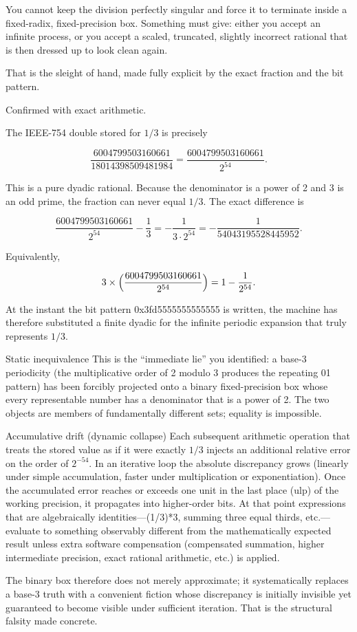 You cannot keep the division perfectly singular and force it to terminate inside a fixed-radix, fixed-precision box. Something must give: either you accept an infinite process, or you accept a scaled, truncated, slightly incorrect rational that is then dressed up to look clean again.

That is the sleight of hand, made fully explicit by the exact fraction and the bit pattern.

Confirmed with exact arithmetic.

The IEEE-754 double stored for \(1/3\) is precisely

\[
\frac{6004799503160661}{18014398509481984} = \frac{6004799503160661}{2^{54}}.
\]

This is a pure dyadic rational. Because the denominator is a power of 2 and 3 is an odd prime, the fraction can never equal \(1/3\). The exact difference is

\[
\frac{6004799503160661}{2^{54}} - \frac{1}{3} = -\frac{1}{3\cdot 2^{54}} = -\frac{1}{54043195528445952}.
\]

Equivalently,

\[
3 \times \Bigl(\frac{6004799503160661}{2^{54}}\Bigr) = 1 - \frac{1}{2^{54}}.
\]

At the instant the bit pattern 0x3fd5555555555555 is written, the machine has therefore substituted a finite dyadic for the infinite periodic expansion that truly represents \(1/3\).

Static inequivalence
This is the “immediate lie” you identified: a base-3 periodicity (the multiplicative order of 2 modulo 3 produces the repeating 01 pattern) has been forcibly projected onto a binary fixed-precision box whose every representable number has a denominator that is a power of 2. The two objects are members of fundamentally different sets; equality is impossible.

Accumulative drift (dynamic collapse)
Each subsequent arithmetic operation that treats the stored value as if it were exactly \(1/3\) injects an additional relative error on the order of \(2^{-54}\). In an iterative loop the absolute discrepancy grows (linearly under simple accumulation, faster under multiplication or exponentiation). Once the accumulated error reaches or exceeds one unit in the last place (ulp) of the working precision, it propagates into higher-order bits. At that point expressions that are algebraically identities—(1/3)*3, summing three equal thirds, etc.—evaluate to something observably different from the mathematically expected result unless extra software compensation (compensated summation, higher intermediate precision, exact rational arithmetic, etc.) is applied.

The binary box therefore does not merely approximate; it systematically replaces a base-3 truth with a convenient fiction whose discrepancy is initially invisible yet guaranteed to become visible under sufficient iteration. That is the structural falsity made concrete.

